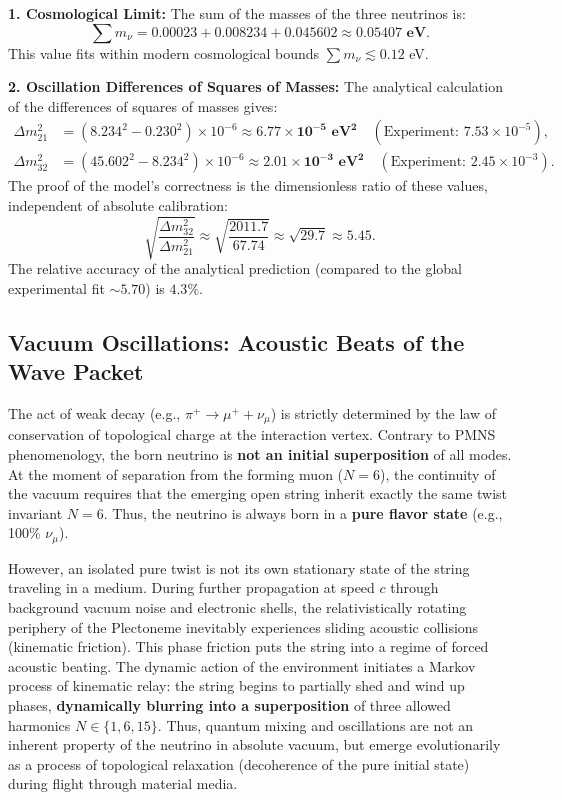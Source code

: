 \documentclass[11pt,a4paper]{article}
\begin{document}
	\textbf{1. Cosmological Limit:}
	The sum of the masses of the three neutrinos is:
	\begin{equation}
		\sum m_\nu = 0.00023 + 0.008234 + 0.045602 \approx \mathbf{0.05407 \text{ eV}}.
	\end{equation}
	This value fits within modern cosmological bounds $\sum m_\nu \lesssim 0.12$ eV.
	
	\textbf{2. Oscillation Differences of Squares of Masses:}
	The analytical calculation of the differences of squares of masses gives:
	\begin{align}
		\Delta m^2_{21} &= (8.234^2 - 0.230^2) \times 10^{-6} \approx \mathbf{6.77 \times 10^{-5} \text{ eV}^2} \quad (\text{Experiment: } 7.53 \times 10^{-5}), \\
		\Delta m^2_{32} &= (45.602^2 - 8.234^2) \times 10^{-6} \approx \mathbf{2.01 \times 10^{-3} \text{ eV}^2} \quad (\text{Experiment: } 2.45 \times 10^{-3}).
	\end{align}
	The proof of the model's correctness is the dimensionless ratio of these values, independent of absolute calibration:
	\begin{equation}
		\sqrt{\frac{\Delta m^2_{32}}{\Delta m^2_{21}}} \approx \sqrt{\frac{2011.7}{67.74}} \approx \sqrt{29.7} \approx \mathbf{5.45}.
	\end{equation}
	The relative accuracy of the analytical prediction (compared to the global experimental fit $\sim 5.70$) is $4.3\%$.
	
\subsection{Vacuum Oscillations: Acoustic Beats of the Wave Packet}
	The act of weak decay (e.g., $\pi^+ \to \mu^+ + \nu_\mu$) is strictly determined by the law of conservation of topological charge at the interaction vertex. Contrary to PMNS phenomenology, the born neutrino is \textbf{not an initial superposition} of all modes. 
	At the moment of separation from the forming muon ($N=6$), the continuity of the vacuum requires that the emerging open string inherit exactly the same twist invariant $N=6$. Thus, the neutrino is always born in a \textbf{pure flavor state} (e.g., 100\% $\nu_\mu$).
	
	However, an isolated pure twist is not its own stationary state of the string traveling in a medium. During further propagation at speed $c$ through background vacuum noise and electronic shells, the relativistically rotating periphery of the Plectoneme inevitably experiences sliding acoustic collisions (kinematic friction). 
	This phase friction puts the string into a regime of forced acoustic beating. The dynamic action of the environment initiates a Markov process of kinematic relay: the string begins to partially shed and wind up phases, \textbf{dynamically blurring into a superposition} of three allowed harmonics $N \in \{1, 6, 15\}$. 
	Thus, quantum mixing and oscillations are not an inherent property of the neutrino in absolute vacuum, but emerge evolutionarily as a process of topological relaxation (decoherence of the pure initial state) during flight through material media.
	
\end{document}
